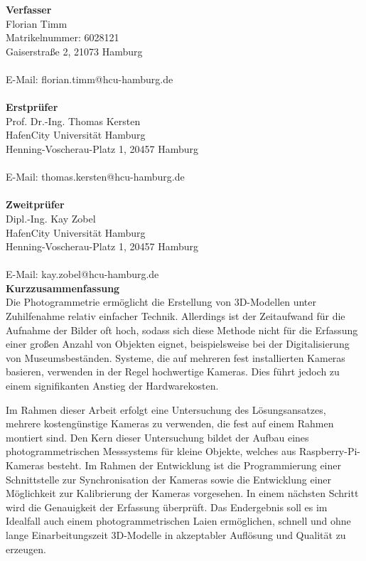 \documentclass[a4paper,12pt,bibliography=totoc, listof=totoc, titlepage]{scrreprt}
\begin{document}
\vspace{2cm}
\noindent\textbf{\large Verfasser}\\
Florian Timm\\
Matrikelnummer: 6028121\\
Gaiserstraße 2, 21073 Hamburg\\
\\
E-Mail: florian.timm@hcu-hamburg.de\\
\vspace{3cm}\\
\noindent\textbf{\large Erstprüfer}\\
Prof. Dr.-Ing. Thomas Kersten\\
HafenCity Universität Hamburg\\
Henning-Voscherau-Platz 1, 20457 Hamburg\\
\\
E-Mail: thomas.kersten@hcu-hamburg.de\\
\vspace{3cm}\\
\textbf{\large Zweitprüfer}\\
Dipl.-Ing. Kay Zobel\\
HafenCity Universität Hamburg\\
Henning-Voscherau-Platz 1, 20457 Hamburg\\
\\
E-Mail: kay.zobel@hcu-hamburg.de\\
\newpage
\noindent\textbf{\large Kurzzusammenfassung}\\
Die Photogrammetrie ermöglicht die Erstellung von 3D-Modellen unter Zuhilfenahme relativ einfacher Technik. Allerdings ist der Zeitaufwand für die Aufnahme der Bilder oft hoch, sodass sich diese Methode nicht für die Erfassung einer großen Anzahl von Objekten eignet, beispielsweise bei der Digitalisierung von Museumsbeständen. Systeme, die auf mehreren fest installierten Kameras basieren, verwenden in der Regel hochwertige Kameras. Dies führt jedoch zu einem signifikanten Anstieg der Hardwarekosten.

Im Rahmen dieser Arbeit erfolgt eine Untersuchung des Lösungsansatzes, mehrere kostengünstige Kameras zu verwenden, die fest auf einem Rahmen montiert sind. Den Kern dieser Untersuchung bildet der Aufbau eines photogrammetrischen Messsystems für kleine Objekte, welches aus Raspberry-Pi-Kameras besteht. Im Rahmen der Entwicklung ist die Programmierung einer Schnittstelle zur Synchronisation der Kameras sowie die Entwicklung einer Möglichkeit zur Kalibrierung der Kameras vorgesehen. In einem nächsten Schritt wird die Genauigkeit der Erfassung überprüft. Das Endergebnis soll es im Idealfall auch einem photogrammetrischen Laien ermöglichen, schnell und ohne lange Einarbeitungszeit 3D-Modelle in akzeptabler Auflösung und Qualität zu erzeugen.
\end{document}
